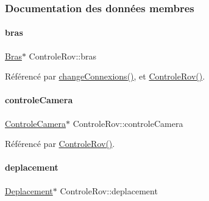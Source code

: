 \subsubsection{Documentation des données membres}
\mbox{\label{class_controle_rov_a1b2e394dd6332b2acd1be0770451e140}} 
\paragraph{\texorpdfstring{bras}{bras}}
{\footnotesize\ttfamily \hyperlink{class_bras}{Bras}$\ast$ Controle\+Rov\+::bras\hspace{0.3cm}{\ttfamily [private]}}



Référencé par \hyperlink{class_controle_rov_a400d5766b9acabb45c1af5f8b22bbe47}{change\+Connexions()}, et \hyperlink{class_controle_rov_acc4d5fea26770217df978d43df2ad51e}{Controle\+Rov()}.

\mbox{\label{class_controle_rov_ac88fe7f2367cca5a24aeda187ee0bac2}} 
\paragraph{\texorpdfstring{controle\+Camera}{controleCamera}}
{\footnotesize\ttfamily \hyperlink{class_controle_camera}{Controle\+Camera}$\ast$ Controle\+Rov\+::controle\+Camera\hspace{0.3cm}{\ttfamily [private]}}



Référencé par \hyperlink{class_controle_rov_acc4d5fea26770217df978d43df2ad51e}{Controle\+Rov()}.

\mbox{\label{class_controle_rov_ae96443be0a82814b27958e6ceb0a0acf}} 
\paragraph{\texorpdfstring{deplacement}{deplacement}}
{\footnotesize\ttfamily \hyperlink{class_deplacement}{Deplacement}$\ast$ Controle\+Rov\+::deplacement\hspace{0.3cm}{\ttfamily [private]}}



